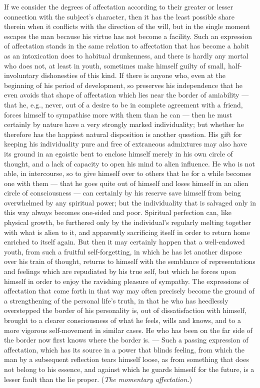 \documentclass[12pt]{article}
\newcommand{\opage}[1]{\marginnote{\footnotesize\textit{[#1]}}}
\begin{document}
If we consider the degrees of affectation according to their greater or lesser connection with the subject's character, then it has the least possible share therein when it conflicts with the direction of the will, but in the single moment escapes the man because his virtue has not become a facility. Such an expression of affectation stands in the same relation to affectation that has become a habit as an intoxication does to habitual drunkenness, and there is hardly any mortal who does not, at least in youth, sometimes make himself guilty of small, half-involuntary dishonesties of this kind. If there is anyone who, even at the beginning of his period of development, so preserves his independence that he even avoids that shape of affectation which lies near the border of amiability --- that he, e.g., never, out of a desire to be in complete agreement with a friend, forces himself to sympathise more with them than he can --- then he must certainly by nature have a very strongly marked individuality; but whether he therefore has the happiest natural disposition is another question. His gift for keeping his individuality pure and free of extraneous admixtures may also have its ground in an egoistic bent to enclose himself merely in his own circle of thought, and a lack of capacity to open his mind to alien influence. He who is not able, in intercourse, so to give himself over to others that he for a while becomes one with them --- that he goes quite out of himself and loses himself in an alien circle of consciousness --- can certainly by his reserve save himself from being overwhelmed by any spiritual power; but the \opage{170}individuality that is salvaged only in this way always becomes one-sided and poor. Spiritual perfection can, like physical growth, be furthered only by the individual's regularly melting together with what is alien to it, and apparently sacrificing itself in order to return home enriched to itself again. But then it may certainly happen that a well-endowed youth, from such a fruitful self-forgetting, in which he has let another dispose over his train of thought, returns to himself with the semblance of representations and feelings which are repudiated by his true self, but which he forces upon himself in order to enjoy the ravishing pleasure of sympathy. The expressions of affectation that come forth in that way may often precisely become the ground of a strengthening of the personal life's truth, in that he who has heedlessly overstepped the border of his personality is, out of dissatisfaction with himself, brought to a clearer consciousness of what he feels, wills and knows, and to a more vigorous self-movement in similar cases. He who has been on the far side of the border now first knows where the border is. --- Such a passing expression of affectation, which has its source in a power that blinds feeling, from which the man by a subsequent reflection tears himself loose, as from something that does not belong to his essence, and against which he guards himself for the future, is a lesser fault than the lie proper. (\emph{The momentary affectation.})
\end{document}
